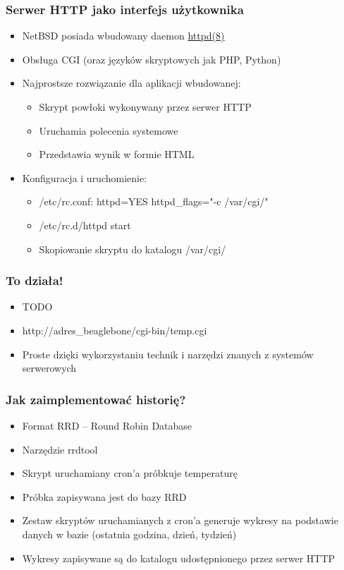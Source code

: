 \documentclass[dvipsnames,table]{beamer}
\begin{document}

\begin{frame}[fragile]
\frametitle{Serwer HTTP jako interfejs użytkownika}
\begin{itemize}
	\item NetBSD posiada wbudowany daemon \href{http://netbsd.gw.com/cgi-bin/man-cgi?httpd++NetBSD-current}{httpd(8)}
	\item Obsługa CGI (oraz języków skryptowych jak PHP, Python)	
	\item Najprostsze rozwiązanie dla aplikacji wbudowanej:
	\begin{itemize}
		\item Skrypt powłoki wykonywany przez serwer HTTP
		\item Uruchamia polecenia systemowe
		\item Przedstawia wynik w formie HTML
	\end{itemize}
	\item Konfiguracja i uruchomienie:
	\begin{itemize}
		\item /etc/rc.conf: httpd=YES httpd\_flags="-c /var/cgi/"
		\item /etc/rc.d/httpd start
		\item Skopiowanie skryptu do katalogu /var/cgi/
	\end{itemize}

\end{itemize}
\lstCGI
\end{frame}

\begin{frame}
\frametitle{To działa!}
\begin{itemize}
	\item TODO
	\item http://adres\_beaglebone/cgi-bin/temp.cgi
	\item Proste dzięki wykorzystaniu technik i narzędzi znanych z systemów serwerowych
\end{itemize}
\end{frame}

\begin{frame}
\frametitle{Jak zaimplementować historię?}
\begin{itemize}
	\item Format RRD -- Round Robin Database
	\item Narzędzie rrdtool
	\item Skrypt uruchamiany cron'a próbkuje temperaturę
	\item Próbka zapisywana jest do bazy RRD
	\item Zestaw skryptów uruchamianych z cron'a generuje wykresy na podstawie danych w bazie (ostatnia godzina, dzień, tydzień)
	\item Wykresy zapisywane są do katalogu udostępnionego przez serwer HTTP

\end{itemize}
\end{frame}
\end{document}
